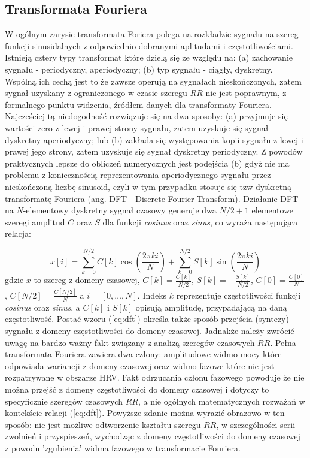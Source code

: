 \subsection{Transformata Fouriera}

W ogólnym zarysie transformata Foriera polega na rozkładzie sygnału na szereg funkcji
sinusidalnych z odpowiednio dobranymi aplitudami i częstotliwościami. Istnieją cztery typy
transformat które dzielą się ze względu na: (a) zachowanie sygnału - periodyczny,
aperiodyczny; (b) typ sygnału - ciągły, dyskretny. Wspólną ich cechą jest to że
zawsze operują na sygnałach nieskończonych, zatem sygnał uzyskany z ograniczonego w czasie
szeregu $RR$ nie jest poprawnym, z formalnego punktu widzenia, źródłem danych dla
transformaty Fouriera. Najcześciej tą niedogodność rozwiązuje się na dwa sposoby:
(a) przyjmuje się wartości zero z lewej i prawej strony sygnału, zatem uzyskuje się sygnał
dyskretny aperiodyczny; lub (b) zakłada się występowania kopii sygnału z lewej i prawej jego
strony, zatem uzyskuje się sygnał dyskretny periodyczny. Z powodów praktycznych
lepsze do obliczeń numerycznych jest podejścia (b) gdyż nie ma problemu z koniecznością
reprezentowania aperiodycznego sygnału przez nieskończoną liczbę sinusoid, czyli w tym
przypadku stosuje się tzw dyskretną transformatę Fouriera (ang. DFT - Discrete Fourier
Transform). Działanie DFT na $N$-elementowy dyskretny sygnał czasowy generuje dwa $N/2+1$
elementowe szeregi amplitud $C$ oraz $S$ dla funkcji \emph{cosinus} oraz \emph{sinus}, co
wyraża następująca relacja:

\begin{equation}
  x[i] = \sum_{k=0}^{N/2} \bar{C}[k]\cos( \frac{2\pi k i}{N}) + \sum_{k=0}^{N/2}\bar{S}[k]\sin( \frac{2\pi k i}{N})
  \label{eq:dft}
\end{equation}
gdzie $x$ to szereg z domeny czasowej, $\bar{C}[k] = \frac{C[k]}{N/2}$, $\bar{S}[k] = -\frac{S[k]}{N/2}$, $\bar{C}[0] = \frac{C[0]}{N}$, $\bar{C}[N/2] = \frac{C[N/2]}{N}$ a $i=[0,\ldots,N]$. Indeks $k$ reprezentuje
częstotliwości funkcji \emph{cosinus} oraz \emph{sinus}, a $C[k]$ i $S[k]$ opisują
amplitudę, przypadającą na daną częstotliwość. Postać wzoru (\ref{eq:dft}) określa także
sposób przejścia (syntezy) sygnału z domeny częstotliwości do domeny czasowej.
Jadnakże należy zwrócić uwagę na bardzo ważny fakt związany z analizą szeregów czasowych
$RR$. Pełna transformata Fouriera zawiera dwa człony:
amplitudowe widmo mocy które odpowiada wariancji z domeny czasowej oraz widmo fazowe
które nie jest rozpatrywane w obszarze HRV. Fakt odrzucania członu fazowego powoduje że
nie można przejść z domeny częstotliwości do domeny czasowej i dotyczy to specyficznie
szeregów czasowych $RR$, a nie ogólnych matematycznych rozważań w kontekście relacji (\ref{eq:dft}). 
Powyższe zdanie można wyrazić obrazowo w ten sposób: nie jest możliwe odtworzenie kształtu
szeregu $RR$, w szczególności serii zwolnień i przyspieszeń, wychodząc z domeny
częstotliwości do domeny czasowej z powodu 'zgubienia' widma fazowego w transformacie
Fouriera.

